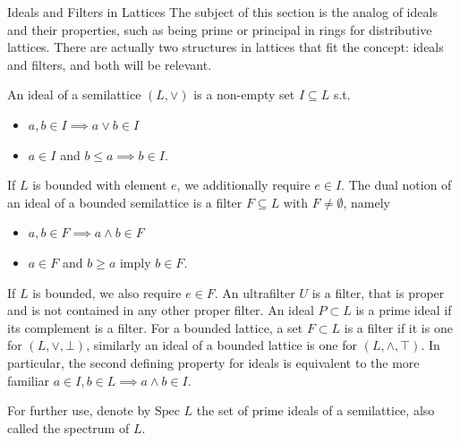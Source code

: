 \begin{subsection}{Ideals and Filters in Lattices} 
The subject of this section is the analog of ideals and their properties, such as being prime or principal in rings for distributive lattices. 
There are actually two structures in lattices that fit the concept: ideals and filters, and both will be relevant.
\begin{definition}
        An ideal of a semilattice \( (L, \vee) \) is a non-empty set \( I \subseteq L \) s.t.
        \begin{itemize}
            \item \( a, b \in I \implies a \vee b \in I \) 
            \item \( a \in I \) and \( b \leq a \implies b \in I \).
        \end{itemize}
        If \( L \) is bounded with element \( e \), we additionally require \( e \in I \).
        The dual notion of an ideal of a bounded semilattice is a filter \(F \subseteq L \) with \( F \neq \emptyset \), namely
        \begin{itemize}
            \item \( a, b \in F \implies a \wedge b \in F \) 
            \item \( a \in F \) and \( b \geq a \) imply \( b \in F \).
        \end{itemize}
        If \( L \) is bounded, we also require \( e \in F \).
        An ultrafilter \( U \) is a filter, that is proper and is not contained in any other proper filter.
        An ideal \( P \subset L \) is a prime ideal if its complement is a filter.
        For a bounded lattice, a set \( F \subset L \) is a filter if it is one for \( (L, \vee, \bot) \),
        similarly an ideal of a bounded lattice is one for \( (L, \wedge, \top) \).
        In particular, the second defining property for ideals is equivalent 
        to the more familiar \( a \in I, b \in L \implies a \wedge b \in I \).
    \end{definition}
    \begin{remark}
        For further use, denote by \( \text{Spec } L \) the set of prime ideals of a semilattice, also called the spectrum of \( L \).
    \end{remark}


\end{subsection}
